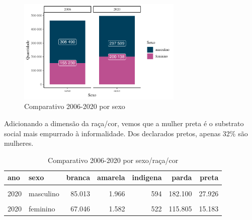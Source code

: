 \documentclass[
  12pt,
  letterpaper,
  DIV=11,
  numbers=noendperiod]{scrartcl}
\begin{document}
\begin{figure}

{\centering \includegraphics[width=0.7\textwidth,height=\textheight]{monografia_files/figure-pdf/count sexo-1.pdf}

}

\caption{Comparativo 2006-2020 por sexo}

\end{figure}

Adicionando a dimensão da raça/cor, vemos que a mulher preta é o
substrato social mais empurrado à informalidade. Dos declarados pretos,
apenas 32\% são mulheres.

\begin{table}
\caption{Comparativo 2006-2020 por sexo/raça/cor}\tabularnewline

\centering
\begin{tabular}[t]{l|l|r|r|r|r|r}
\hline
ano & sexo & branca & amarela & indigena & parda & preta\\
\hline
\cellcolor{gray!6}{2006} & \cellcolor{gray!6}{masculino} & \cellcolor{gray!6}{132.447} & \cellcolor{gray!6}{2.226} & \cellcolor{gray!6}{1.196} & \cellcolor{gray!6}{148.098} & \cellcolor{gray!6}{24.523}\\
\hline
2020 & masculino & 85.013 & 1.966 & 594 & 182.100 & 27.926\\
\hline
\cellcolor{gray!6}{2006} & \cellcolor{gray!6}{feminino} & \cellcolor{gray!6}{77.294} & \cellcolor{gray!6}{1.099} & \cellcolor{gray!6}{814} & \cellcolor{gray!6}{67.793} & \cellcolor{gray!6}{8.230}\\
\hline
2020 & feminino & 67.046 & 1.582 & 522 & 115.805 & 15.183\\
\hline
\end{tabular}
\end{table}
\end{document}
